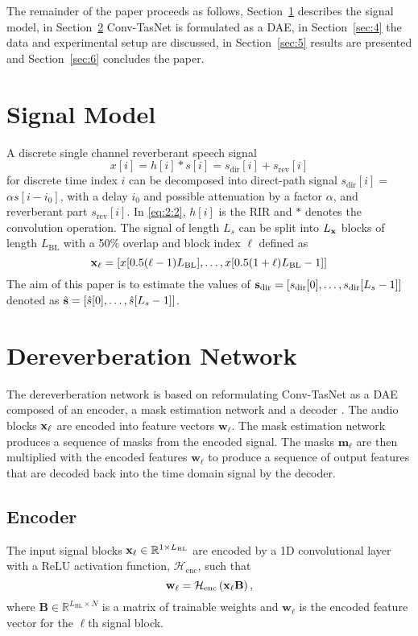 \documentclass[conference,a4paper]{IEEEtran}
\newcommand{\mat}[1]{\mathbf{#1}}
\newcommand{\Real}{\mathbb{R}}
\begin{document}
The remainder of the paper proceeds as follows, Section~\ref{sec:2} describes the signal model, in Section~\ref{sec:3} \ac{Conv-TasNet} is formulated as a \ac{DAE}, in Section~\ref{sec:4} the data and experimental setup are discussed, in Section~\ref{sec:5} 
results are presented and 
Section~\ref{sec:6} {concludes the paper.}


\section{Signal Model}\label{sec:2}
A discrete single channel reverberant speech signal
\begin{equation} \label{eq:2:2}
    x[i] = h[i]\ast s[i] = s_\mathrm{dir}[i] + {s_\mathrm{rev}[i]}
\end{equation}
for discrete time index $i$ can be decomposed into direct-path signal $s_\mathrm{dir}[i]=$ $\alpha s[i-i_0]$, with a delay $i_0$ and possible attenuation by a factor $\alpha$, and reverberant part $s_\mathrm{rev}[i]$. In \eqref{eq:2:2}, $h[i]$ is the \ac{RIR} and $\ast$ denotes the convolution operation. The signal of length $L_s$ can be split into  $L_{\boldsymbol{\mathrm{x}}}$ blocks of length $L_{\mathrm{BL}}$ with a 50\% overlap and block index $\ell$ defined as
\begin{equation}\label{eq:InputSignalBlock}
    \boldsymbol{\mathrm{x}}_\ell = 
\left[x[0.5(\ell-1)L_{\mathrm{BL}}],\ldots, x[0.5(1+\ell) L_{\mathrm{BL}}-1]\right]
\end{equation}
The aim of this paper is {to} estimate the values of ${\boldsymbol{\mathrm{s}}}_\mathrm{dir}=[{s}_\mathrm{dir}[0],\ldots,{s}_\mathrm{dir}[L_s-1]]$ denoted as ${\hat{\boldsymbol{\mathrm{s}}}=[\hat{s}[0],\ldots,\hat{s}[L_s-1]]}$.

\section{Dereverberation Network}\label{sec:3}
The dereverberation network is based on reformulating \ac{Conv-TasNet} as a \ac{DAE} composed of an encoder, {a} mask estimation network and a decoder \cite{convtasnet,RGH22_AttTASNET}. The audio blocks $\boldsymbol{\mathrm{x}}_{\ell}$ are encoded into feature vectors $\mat{w}_\ell$. The mask estimation network
produces a sequence of masks from the encoded signal. The masks $\mat{m}_\ell$ are then multiplied with the encoded features $\mat{w}_\ell$ to produce a sequence of output features that are decoded back into the time domain signal by the decoder.
\subsection{Encoder}
The input signal blocks $\vekt{x}_\ell\in\Real^{1\times L_{\mathrm{BL}}}$ are encoded by a 1D convolutional layer with a \ac{ReLU} activation function, $\mathcal{H}_\mathrm{enc}$, such that
\begin{equation}\label{eq:encoder}
 \mat{w}_\ell=\mathcal{H}_\mathrm{enc}\left(\vekt{x}_\ell\mat{B}\right){,}
\end{equation}
where $\mat{B}\in\mathbb{R}^{L_{\mathrm{BL}}\times N}$ is a matrix of trainable weights and $\mat{w}_\ell$ is the encoded feature vector for the $\ell$th signal block. 
\end{document}
